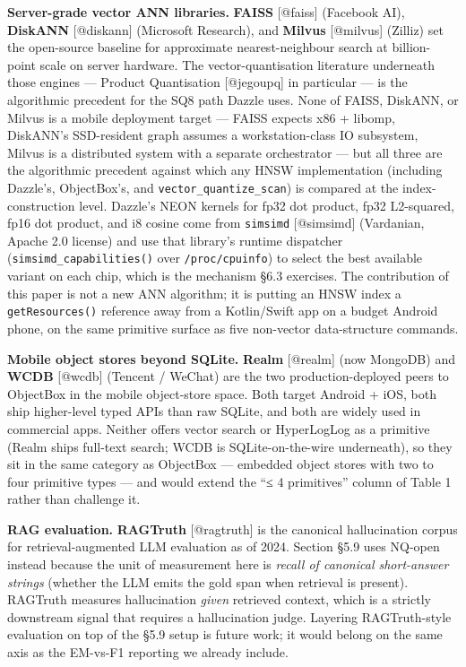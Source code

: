 \textbf{Server-grade vector ANN libraries.} \textbf{FAISS} {[}@faiss{]}
(Facebook AI), \textbf{DiskANN} {[}@diskann{]} (Microsoft Research), and
\textbf{Milvus} {[}@milvus{]} (Zilliz) set the open-source baseline for
approximate nearest-neighbour search at billion-point scale on server hardware.
The vector-quantisation literature underneath those engines --- Product
Quantisation {[}@jegoupq{]} in particular --- is the algorithmic precedent for
the SQ8 path Dazzle uses. None of FAISS, DiskANN, or Milvus is a mobile
deployment target --- FAISS expects x86 + libomp, DiskANN's SSD-resident graph
assumes a workstation-class IO subsystem, Milvus is a distributed system with a
separate orchestrator --- but all three are the algorithmic precedent against
which any HNSW implementation (including Dazzle's, ObjectBox's, and
\texttt{vector\_quantize\_scan}) is compared at the index-construction level.
Dazzle's NEON kernels for fp32 dot product, fp32 L2-squared, fp16 dot product,
and i8 cosine come from \texttt{simsimd} {[}@simsimd{]} (Vardanian, Apache 2.0
license) and use that library's runtime dispatcher
(\texttt{simsimd\_capabilities()} over \texttt{/proc/cpuinfo}) to select the
best available variant on each chip, which is the mechanism §6.3 exercises. The
contribution of this paper is not a new ANN algorithm; it is putting an HNSW
index a \texttt{getResources()} reference away from a Kotlin/Swift app on a
budget Android phone, on the same primitive surface as five non-vector
data-structure commands.

\textbf{Mobile object stores beyond SQLite.} \textbf{Realm} {[}@realm{]} (now
MongoDB) and \textbf{WCDB} {[}@wcdb{]} (Tencent / WeChat) are the two
production-deployed peers to ObjectBox in the mobile object-store space. Both
target Android + iOS, both ship higher-level typed APIs than raw SQLite, and
both are widely used in commercial apps. Neither offers vector search or
HyperLogLog as a primitive (Realm ships full-text search; WCDB is
SQLite-on-the-wire underneath), so they sit in the same category as ObjectBox
--- embedded object stores with two to four primitive types --- and would extend
the ``≤ 4 primitives'' column of Table 1 rather than challenge it.

\textbf{RAG evaluation.} \textbf{RAGTruth} {[}@ragtruth{]} is the canonical
hallucination corpus for retrieval-augmented LLM evaluation as of 2024. Section
§5.9 uses NQ-open instead because the unit of measurement here is \emph{recall
of canonical short-answer strings} (whether the LLM emits the gold span when
retrieval is present). RAGTruth measures hallucination \emph{given} retrieved
context, which is a strictly downstream signal that requires a hallucination
judge. Layering RAGTruth-style evaluation on top of the §5.9 setup is future
work; it would belong on the same axis as the EM-vs-F1 reporting we already
include.

